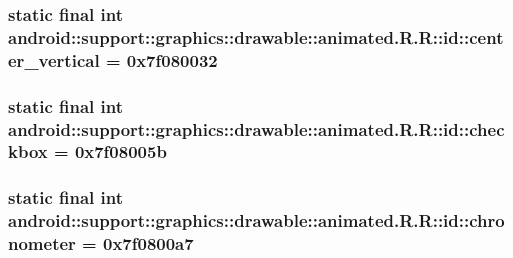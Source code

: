 \hypertarget{classandroid_1_1support_1_1graphics_1_1drawable_1_1animated_1_1_r_1_1id_be1f8f4569de4411fe0af0460a214dde}{
\subsubsection[{center\_\-vertical}]{\setlength{\rightskip}{0pt plus 5cm}static final int android::support::graphics::drawable::animated.R.R::id::center\_\-vertical = 0x7f080032}}
\label{classandroid_1_1support_1_1graphics_1_1drawable_1_1animated_1_1_r_1_1id_be1f8f4569de4411fe0af0460a214dde}


\hypertarget{classandroid_1_1support_1_1graphics_1_1drawable_1_1animated_1_1_r_1_1id_e2bb8cf741ac825b98d077243f0f576e}{
\subsubsection[{checkbox}]{\setlength{\rightskip}{0pt plus 5cm}static final int android::support::graphics::drawable::animated.R.R::id::checkbox = 0x7f08005b}}
\label{classandroid_1_1support_1_1graphics_1_1drawable_1_1animated_1_1_r_1_1id_e2bb8cf741ac825b98d077243f0f576e}


\hypertarget{classandroid_1_1support_1_1graphics_1_1drawable_1_1animated_1_1_r_1_1id_6754de4917dd63aeb69905c3c0b603bb}{
\subsubsection[{chronometer}]{\setlength{\rightskip}{0pt plus 5cm}static final int android::support::graphics::drawable::animated.R.R::id::chronometer = 0x7f0800a7}}
\label{classandroid_1_1support_1_1graphics_1_1drawable_1_1animated_1_1_r_1_1id_6754de4917dd63aeb69905c3c0b603bb}


